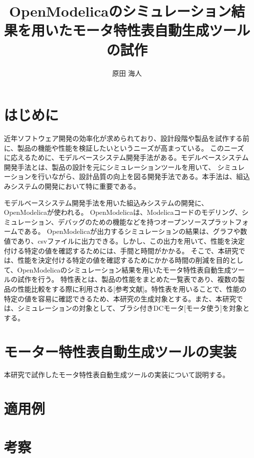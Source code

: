 \documentclass[uplatex, 10pt, a4p]{jsarticle}
\title{OpenModelicaのシミュレーション結果を用いたモータ特性表自動生成ツールの試作}
\author{原田 海人}
\begin{document}
\maketitle


\section{はじめに}
近年ソフトウェア開発の効率化が求められており、設計段階や製品を試作する前に、製品の機能や性能を検証したいというニーズが高まっている\cite{modelicaモデルベース本}。
このニーズに応えるために、モデルベースシステム開発手法がある\cite{modelicaモデルベース本}。モデルベースシステム開発手法とは、製品の設計を元にシミュレーションツールを用いて、
シミュレーションを行いながら、設計品質の向上を図る開発手法である\cite{ipa_2016}。本手法は、組込みシステムの開発において特に重要である\cite{ipa_useful_modelbase_dev}。

モデルベースシステム開発手法を用いた組込みシステムの開発に、OpenModelica\cite{open_modelica}が使われる。
OpenModelicaは、Modelica\cite{modelicaモデルベース本}コードのモデリング、シミュレーション、デバッグのための機能などを持つオープンソースプラットフォームである。
OpenModelicaが出力するシミュレーションの結果は、グラフや数値であり、csvファイルに出力できる。しかし、この出力を用いて、性能を決定付ける特定の値を確認するためには、手間と時間がかかる。
そこで、本研究では、性能を決定付ける特定の値を確認するためにかかる時間の削減を目的として、OpenModelicaのシミュレーション結果を用いたモータ特性表自動生成ツールの試作を行う。
特性表とは、製品の性能をまとめた一覧表であり、複数の製品の性能比較をする際に利用される[参考文献]。特性表を用いることで、性能の特定の値を容易に確認できるため、本研究の生成対象とする。また、本研究では、シミュレーションの対象として、ブラシ付きDCモータ[モータ使う]を対象とする。


\section{モーター特性表自動生成ツールの実装}\label{cha:OverviewFunction}
本研究で試作したモータ特性表自動生成ツールの実装について説明する。

\section{適用例}\label{sec:Indication}



\section{考察}\label{sec:Evaluation}
\end{document}
